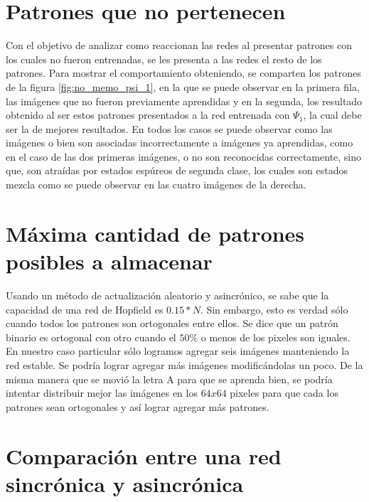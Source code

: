 \documentclass{sig-alternate}
\begin{document}
\section*{Patrones que no pertenecen}

Con el objetivo de analizar como reaccionan las redes al presentar patrones con los cuales no fueron entrenadas, se les presenta a las redes el resto de los patrones. Para mostrar el comportamiento  obteniendo, se comparten los patrones de la figura \ref{fig:no_memo_psi_1}, en la que se puede observar en la primera fila, las imágenes que no fueron previamente aprendidas y en la segunda, los resultado obtenido al ser estos patrones presentados a la red entrenada con $\Psi_1$, la cual debe ser la de mejores resultados. En todos los casos se puede observar como las imágenes o bien son asociadas incorrectamente a imágenes ya aprendidas, como en el caso de las dos primeras imágenes, o no son reconocidas correctamente, sino que, son atraídas por estados espúreos de segunda clase, los cuales son estados  mezcla como se puede observar en las cuatro imágenes de la derecha. \\

\section*{Máxima cantidad de patrones posibles a almacenar}

Usando un método de actualización aleatorio y asincrónico, se sabe que la capacidad de una red de Hopfield es $0.15*N$.
Sin embargo, esto es verdad sólo cuando todos los patrones son ortogonales entre ellos.
Se dice que un patrón binario es ortogonal con otro cuando el $50\%$ o menos de los pixeles son iguales.\\

En nuestro caso particular sólo logramos agregar seis imágenes manteniendo la red estable.
Se podría lograr agregar más imágenes modificándolas un poco.
De la misma manera que se movió la letra A para que se aprenda bien, se podría intentar distribuir mejor las imágenes
en los $64x64$ pixeles para que cada los patrones sean ortogonales y así lograr agregar más patrones.\\

\section*{Comparación entre una red sincrónica y asincrónica}
\end{document}
